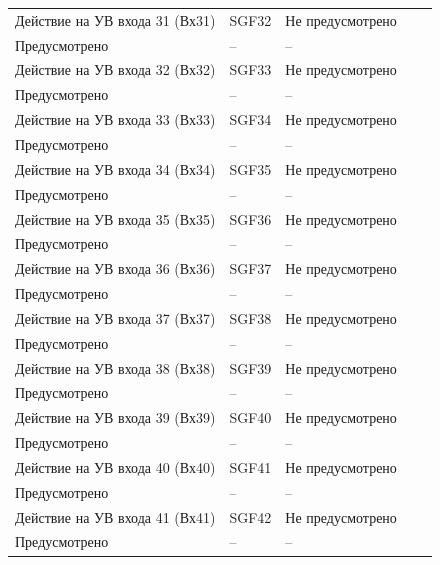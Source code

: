 \begin{longtable}{|>{\centering\arraybackslash}m{5.3cm}|>{\centering\arraybackslash}m{3.3cm}|>{\centering\arraybackslash}m{4.2cm}|>{\centering\arraybackslash}m{1.8cm}|>{\centering\arraybackslash}m{1cm}|}
\hline
\centering Действие на УВ входа 31 (Вх31)  & \centering SGF32 & \centering Не предусмотрено \\ Предусмотрено & \centering -- & \centering \arraybackslash -- \\
\hline
\centering Действие на УВ входа 32 (Вх32)  & \centering SGF33 & \centering Не предусмотрено \\ Предусмотрено & \centering -- & \centering \arraybackslash -- \\
\hline
\centering Действие на УВ входа 33 (Вх33)  & \centering SGF34 & \centering Не предусмотрено \\ Предусмотрено & \centering -- & \centering \arraybackslash -- \\
\hline
\centering Действие на УВ входа 34 (Вх34)  & \centering SGF35 & \centering Не предусмотрено \\ Предусмотрено & \centering -- & \centering \arraybackslash -- \\
\hline
\centering Действие на УВ входа 35 (Вх35)  & \centering SGF36 & \centering Не предусмотрено \\ Предусмотрено & \centering -- & \centering \arraybackslash -- \\
\hline
\centering Действие на УВ входа 36 (Вх36)  & \centering SGF37 & \centering Не предусмотрено \\ Предусмотрено & \centering -- & \centering \arraybackslash -- \\
\hline
\centering Действие на УВ входа 37 (Вх37)  & \centering SGF38 & \centering Не предусмотрено \\ Предусмотрено & \centering -- & \centering \arraybackslash -- \\
\hline
\centering Действие на УВ входа 38 (Вх38)  & \centering SGF39 & \centering Не предусмотрено \\ Предусмотрено & \centering -- & \centering \arraybackslash -- \\
\hline
\centering Действие на УВ входа 39 (Вх39)  & \centering SGF40 & \centering Не предусмотрено \\ Предусмотрено & \centering -- & \centering \arraybackslash -- \\
\hline
\centering Действие на УВ входа 40 (Вх40)  & \centering SGF41 & \centering Не предусмотрено \\ Предусмотрено & \centering -- & \centering \arraybackslash -- \\
\hline
\centering Действие на УВ входа 41 (Вх41)  & \centering SGF42 & \centering Не предусмотрено \\ Предусмотрено & \centering -- & \centering \arraybackslash -- \\

\end{longtable}
